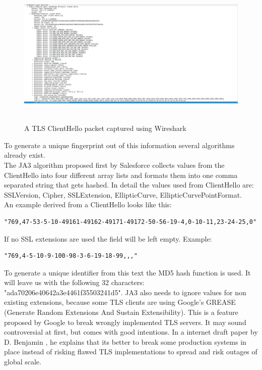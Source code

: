 \documentclass[12pt]{scrbook}
\begin{document}
\begin{figure}[!htb]
    \centering
    \includegraphics[height=7cm]{./images/tls_client_hello_wireshark.png}
    \caption{A TLS ClientHello packet captured using Wireshark}
\end{figure}

To generate a unique fingerprint out of this information several algorithms
already
exist.\\The JA3 algorithm proposed first by Salesforce \cite{ja3Salesforce}
collects values from the ClientHello into four different array lists and formats
them into one comma separated string that gets hashed. In detail the values used
from ClientHello are: SSLVersion, Cipher, SSLExtension, EllipticCurve,
EllipticCurvePointFormat.\\An example derived from a ClientHello looks like
this:
\begin{verbatim}
"769,47-53-5-10-49161-49162-49171-49172-50-56-19-4,0-10-11,23-24-25,0"
\end{verbatim}
If no SSL extensions are used the field will be left empty. Example:
\begin{verbatim}
"769,4-5-10-9-100-98-3-6-19-18-99,,,"
\end{verbatim}
To generate a unique identifier from this text the MD5 hash function is used.
It will leave us with the following 32 characters:
"ada70206e40642a3e4461f35503241d5". JA3 also needs to ignore values for non
existing extensions, because some TLS clients are using Google’s GREASE
(Generate Random Extensions And Sustain Extensibility). This is a feature
proposed by Google to break wrongly implemented TLS servers. It may sound
controversial at first, but comes with good intentions. In a internet draft
paper by D. Benjamin \cite{greaseDraft}, he explains that its better to break
some production systems in place instead of risking flawed TLS
implementations to spread and risk outages of global scale.
\end{document}

